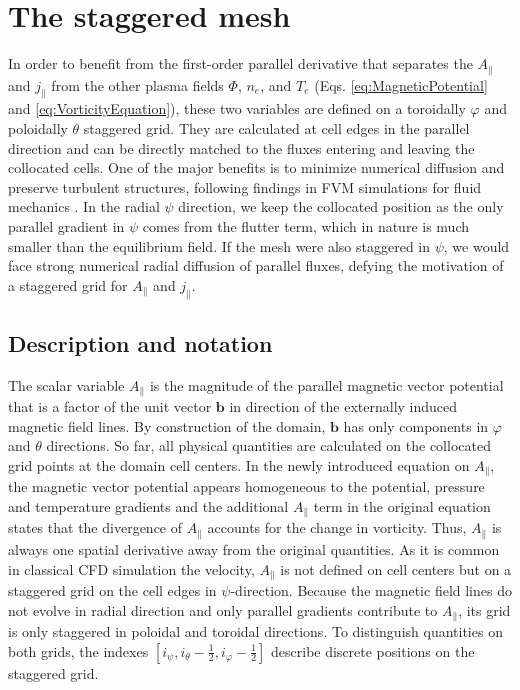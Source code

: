 \section{The staggered mesh}


In order to benefit from the first-order parallel derivative that separates the $A_\parallel$ and $j_\parallel$ from the other plasma fields $\Phi$, $n_e$, and $T_e$ (Eqs. \ref{eq:MagneticPotential} and \ref{eq:VorticityEquation}), these two variables are defined on a toroidally $\varphi$ and poloidally $\theta$ staggered grid. They are calculated at cell edges in the parallel direction and can be directly matched to the fluxes entering and leaving the collocated cells. One of the major benefits is to minimize numerical diffusion and preserve turbulent structures, following findings in FVM simulations for fluid mechanics \cite{meier1999comparison}. In the radial $\psi$ direction, we keep the collocated position as the only parallel gradient in $\psi$ comes from the flutter term, which in nature is much smaller than the equilibrium field. If the mesh were also staggered in $\psi$, we would face strong numerical radial diffusion of parallel fluxes, defying the motivation of a staggered grid for $A_\parallel$ and $j_\parallel$. \newline



\subsection{Description and notation}
The scalar variable $A_\parallel$ is the magnitude of the parallel magnetic vector potential that is a factor of the unit vector $\mathbf{b}$ in direction of the externally induced magnetic field lines. By construction of the domain, $\mathbf{b}$ has only components in $\varphi$ and $\theta$ directions. So far, all physical quantities are calculated on the collocated grid points at the domain cell centers. In the newly introduced equation on $A_\parallel$, the magnetic vector potential appears homogeneous to the potential, pressure and temperature gradients and the additional $A_\parallel$ term in the original equation states that the divergence of $A_\parallel$ accounts for the change in vorticity. Thus, $A_\parallel$ is always one spatial derivative away from the original quantities. As it is common in classical CFD simulation the velocity, $A_\parallel$ is not defined on cell centers but on a staggered grid on the cell edges in $\psi$-direction. Because the magnetic field lines do not evolve in radial direction and only parallel gradients contribute to $A_\parallel$, its grid is only staggered in  poloidal and toroidal directions. To distinguish quantities on both grids, the indexes $[i_\psi, i_\theta - \frac{1}{2},i_\varphi-\frac{1}{2}]$ describe discrete positions on the staggered grid. \\

